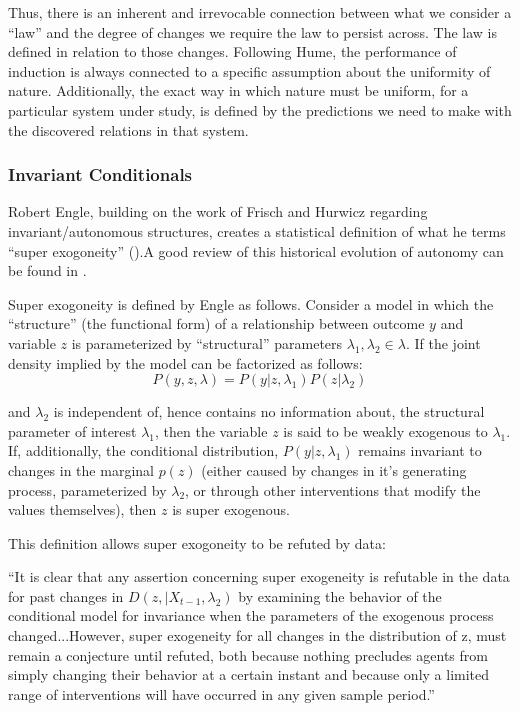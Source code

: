 \documentclass[a4paper,12pt]{article}
\begin{document}
Thus, there is an inherent and irrevocable connection between what we consider a ``law'' and the degree of changes we require the law to persist across. The law is defined in relation to those changes. Following Hume, the performance of induction is always connected to a specific assumption about the uniformity of nature. Additionally, the exact way in which nature must be uniform, for a particular system under study, is defined by the predictions we need to make with the discovered relations in that system.


\subsubsection{Invariant Conditionals}

Robert Engle, building on the work of Frisch and Hurwicz regarding invariant/autonomous structures, creates a statistical definition of what he terms ``super exogoneity'' (\cite{Engle1983}).A good review of this historical evolution of autonomy can be found in \cite{Aldrich1989}.

Super exogoneity is defined by Engle as follows. Consider a model in which the ``structure'' (the functional form) of a relationship between outcome $y$ and variable $z$ is parameterized by ``structural'' parameters $\lambda_1, \lambda_2 \in \lambda$. If the joint density implied by the model can be factorized as follows:
%
$$
P(y, z, \lambda) = P(y | z, \lambda_1)P(z | \lambda_2)
$$

and $\lambda_2$ is independent of, hence contains no information about, the structural parameter of interest $\lambda_1$, then the variable $z$ is said to be weakly exogenous to $\lambda_1$. If, additionally, the conditional distribution, $P(y | z, \lambda_1)$ remains invariant to changes in the marginal $p(z)$ (either caused by changes in it's generating process, parameterized by $\lambda_2$, or through other interventions that modify the values themselves), then $z$ is super exogenous.

This definition allows super exogoneity to be refuted by data:

\begin{displayquote}
``It is clear that any assertion concerning super exogeneity is refutable in the data for past changes in $D(z, | X_{t-1}, \lambda_2)$ by examining the behavior of the conditional model for invariance when the parameters of the exogenous process changed...However, super exogeneity for all changes in the distribution of z, must remain a conjecture until refuted, both because nothing precludes agents from simply changing their behavior at a certain instant and because only a limited range of interventions will have occurred in any given sample period.''
\end{displayquote}
\end{document}
